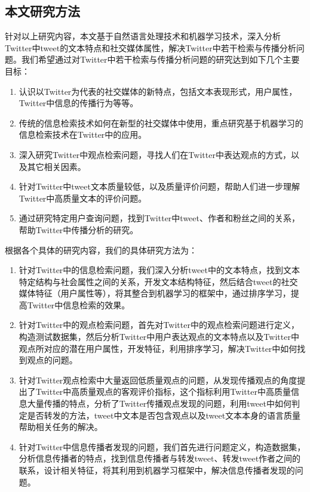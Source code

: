 \subsection{本文研究方法}
针对以上研究内容，本文基于自然语言处理技术和机器学习技术，深入分析Twitter中tweet的文本特点和社交媒体属性，解决Twitter中若干检索与传播分析问题。我们希望通过对Twitter中若干检索与传播分析问题的研究达到如下几个主要目标：
\begin{enumerate}
\item 认识以Twitter为代表的社交媒体的新特点，包括文本表现形式，用户属性，Twitter中信息的传播行为等等。
\item 传统的信息检索技术如何在新型的社交媒体中使用，重点研究基于机器学习的信息检索技术在Twitter中的应用。
\item 深入研究Twitter中观点检索问题，寻找人们在Twitter中表达观点的方式，以及其它相关因素。
\item 针对Twitter中tweet文本质量较低，以及质量评价问题，帮助人们进一步理解Twitter中高质量文本的评价问题。
\item 通过研究特定用户查询问题，找到Twitter中tweet、作者和粉丝之间的关系，帮助Twitter中传播分析的研究。
\end{enumerate}  

根据各个具体的研究内容，我们的具体研究方法为：

\begin{enumerate}
\item 针对Twitter中的信息检索问题，我们深入分析tweet中的文本特点，找到文本特定结构与社会属性之间的关系，开发文本结构特征，然后结合tweet的社交媒体特征（用户属性等），将其整合到机器学习的框架中，通过排序学习，提高Twitter中信息检索的效果。
\item 针对Twitter中的观点检索问题，首先对Twitter中的观点检索问题进行定义，构造测试数据集，然后分析Twitter中用户表达观点的文本特点以及Twitter中观点所对应的潜在用户属性，开发特征，利用排序学习，解决Twitter中如何找到观点的问题。
\item 针对Twitter观点检索中大量返回低质量观点的问题，从发现传播观点的角度提出了Twitter中高质量观点的客观评价指标，这个指标利用Twitter中高质量信息大量传播的特点，分析了Twitter传播观点发现的问题，利用tweet中如何判定是否转发的方法，tweet中文本是否包含观点以及tweet文本本身的语言质量帮助相关任务的解决。
\item  针对Twitter中信息传播者发现的问题，我们首先进行问题定义，构造数据集，分析信息传播者的特点，找到信息传播者与转发tweet、转发tweet作者之间的联系，设计相关特征，将其利用到机器学习框架中，解决信息传播者发现的问题。
\end{enumerate}  

